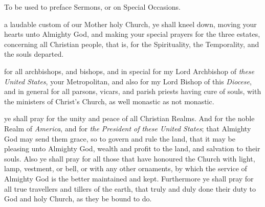 \vspace{-1ex}

\begin{secrubric}
	{To be used to preface Sermons, or on Special Occasions.}
\end{secrubric}

\vspace{-1ex}

 a laudable custom of our Mother holy Church, ye shall kneel down, moving your hearts unto Almighty God, and making your special prayers for the three estates, concerning all Christian people, that is, for the Spirituality, the Temporality, and the souls departed.

 for all archbishops, and bishops, and in special for my Lord Archbishop of \textit{these United States}, your Metropolitan, and also for my Lord Bishop of this \textit{Diocese}, and in general for all parsons, vicars, and parish priests having cure of souls, with the ministers of Christ's Church, as well monastic as not monastic.

 ye shall pray for the unity and peace of all Christian Realms. And for the noble Realm of \textit{America}, and for \textit{the President of these United States}; that Almighty God may send them grace, so to govern and rule the land, that it may be pleasing unto Almighty God, wealth and profit to the land, and salvation to their souls. Also ye shall pray for all those that have honoured the Church with light, lamp, vestment, or bell, or with any other ornaments, by which the service of Almighty God is the better maintained and kept. Furthermore ye shall pray for all true travellers and tillers of the earth, that truly and duly done their duty to God and holy Church, as they be bound to do.

